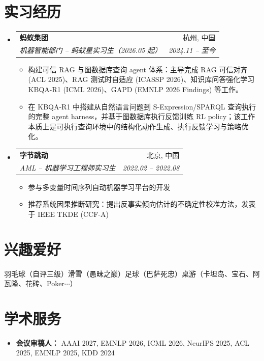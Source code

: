 \documentclass[letterpaper,11pt]{article}
\makeatletter
\newcommand{\resumeItem}[1]{
  \item\small{#1 \vspace{-2pt}}
}
\newcommand{\resumeSubheading}[4]{
  \vspace{-2pt}\item
    \begin{tabular*}{0.97\textwidth}[t]{l@{\extracolsep{\fill}}r}
      \textbf{#1} & #2 \\
      \textit{\small#3} & \textit{\small #4} \\
    \end{tabular*}\vspace{-7pt}
}
\newcommand{\resumeSubHeadingListStart}{\begin{itemize}[leftmargin=0.15in, label={}]}
\newcommand{\resumeSubHeadingListEnd}{\end{itemize}}
\newcommand{\resumeItemListStart}{\begin{itemize}[leftmargin=0.2in]}
\newcommand{\resumeItemListEnd}{\end{itemize}\vspace{-5pt}}
\makeatother
\begin{document}
\section{实习经历}
  \resumeSubHeadingListStart
    \resumeSubheading
      {蚂蚁集团}{杭州, 中国}
      {机器智能部门 -- 蚂蚁星实习生（2026.05 起）}{2024.11 -- 至今}
      \resumeItemListStart
        \resumeItem{构建可信 RAG 与图数据库查询 agent 体系：主导完成 RAG 可信对齐 (ACL 2025)、RAG 测试时自适应 (ICASSP 2026)、知识库问答强化学习 KBQA-R1 (ICML 2026)、GAPD (EMNLP 2026 Findings) 等工作。}
        \resumeItem{在 KBQA-R1 中搭建从自然语言问题到 S-Expression/SPARQL 查询执行的完整 agent harness，并基于图数据库执行反馈训练 RL policy；该工作本质上是可执行查询环境中的结构化动作生成、执行反馈学习与策略优化。}
      \resumeItemListEnd

    \resumeSubheading
      {字节跳动}{北京, 中国}
      {AML -- 机器学习工程师实习生}{2022.02 -- 2022.08}
      \resumeItemListStart
        \resumeItem{参与多变量时间序列自动机器学习平台的开发}
        \resumeItem{推荐系统因果推断研究：提出反事实倾向估计的不确定性校准方法，发表于 IEEE TKDE (CCF-A)}
      \resumeItemListEnd
  \resumeSubHeadingListEnd

\section{兴趣爱好}
羽毛球（自评三级）\quad 滑雪（愚昧之巅）\quad 足球（巴萨死忠）\quad 桌游（卡坦岛、宝石、阿瓦隆、花砖、Poker$\cdots$）

\section{学术服务}
\begin{itemize}[leftmargin=0.15in, label={}, nosep]
  \item \textbf{会议审稿人：} AAAI 2027, EMNLP 2026, ICML 2026, NeurIPS 2025, ACL 2025, EMNLP 2025, KDD 2024
\end{itemize}

\end{document}
